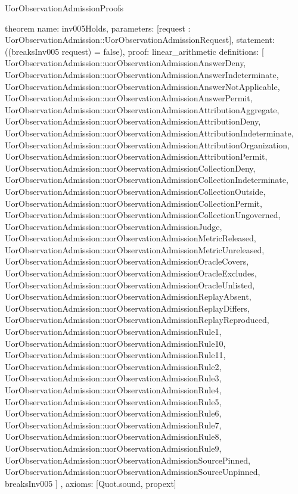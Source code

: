 \begin{lexlean}{UorObservationAdmissionProofs}
\begin{semanticmodule}
theorem{
  name: inv005Holds,
  parameters: [request : UorObservationAdmission::UorObservationAdmissionRequest],
  statement: ((breaksInv005 request) = false),
  proof: linear_arithmetic{
    definitions: [
      UorObservationAdmission::uorObservationAdmissionAnswerDeny,
      UorObservationAdmission::uorObservationAdmissionAnswerIndeterminate,
      UorObservationAdmission::uorObservationAdmissionAnswerNotApplicable,
      UorObservationAdmission::uorObservationAdmissionAnswerPermit,
      UorObservationAdmission::uorObservationAdmissionAttributionAggregate,
      UorObservationAdmission::uorObservationAdmissionAttributionDeny,
      UorObservationAdmission::uorObservationAdmissionAttributionIndeterminate,
      UorObservationAdmission::uorObservationAdmissionAttributionOrganization,
      UorObservationAdmission::uorObservationAdmissionAttributionPermit,
      UorObservationAdmission::uorObservationAdmissionCollectionDeny,
      UorObservationAdmission::uorObservationAdmissionCollectionIndeterminate,
      UorObservationAdmission::uorObservationAdmissionCollectionOutside,
      UorObservationAdmission::uorObservationAdmissionCollectionPermit,
      UorObservationAdmission::uorObservationAdmissionCollectionUngoverned,
      UorObservationAdmission::uorObservationAdmissionJudge,
      UorObservationAdmission::uorObservationAdmissionMetricReleased,
      UorObservationAdmission::uorObservationAdmissionMetricUnreleased,
      UorObservationAdmission::uorObservationAdmissionOracleCovers,
      UorObservationAdmission::uorObservationAdmissionOracleExcludes,
      UorObservationAdmission::uorObservationAdmissionOracleUnlisted,
      UorObservationAdmission::uorObservationAdmissionReplayAbsent,
      UorObservationAdmission::uorObservationAdmissionReplayDiffers,
      UorObservationAdmission::uorObservationAdmissionReplayReproduced,
      UorObservationAdmission::uorObservationAdmissionRule1,
      UorObservationAdmission::uorObservationAdmissionRule10,
      UorObservationAdmission::uorObservationAdmissionRule11,
      UorObservationAdmission::uorObservationAdmissionRule2,
      UorObservationAdmission::uorObservationAdmissionRule3,
      UorObservationAdmission::uorObservationAdmissionRule4,
      UorObservationAdmission::uorObservationAdmissionRule5,
      UorObservationAdmission::uorObservationAdmissionRule6,
      UorObservationAdmission::uorObservationAdmissionRule7,
      UorObservationAdmission::uorObservationAdmissionRule8,
      UorObservationAdmission::uorObservationAdmissionRule9,
      UorObservationAdmission::uorObservationAdmissionSourcePinned,
      UorObservationAdmission::uorObservationAdmissionSourceUnpinned,
      breaksInv005
    ]
  },
  axioms: [Quot.sound, propext]
}


\end{semanticmodule}
\end{lexlean}
